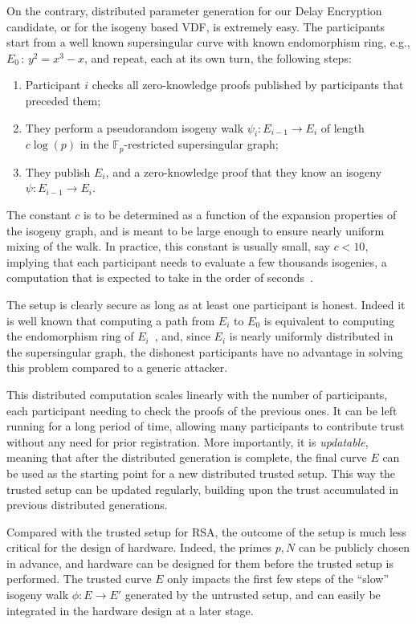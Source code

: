 \documentclass{llncs}
\newcommand{\F}{\mathbb{F}}
\begin{document}
On the contrary, distributed parameter generation for our Delay
Encryption candidate, or for the isogeny based VDF, is extremely
easy. %
The participants start from a well known supersingular curve with
known endomorphism ring, e.g., $E_0\,:\,y^2=x^3-x$, and repeat, each
at its own turn, the following steps:
\begin{enumerate}
\item Participant $i$ checks all zero-knowledge proofs published by
  participants that preceded them;
\item They perform a pseudorandom isogeny walk $\psi_i:E_{i-1}\to E_i$
  of length $c\log(p)$ in the $\F_p$-restricted supersingular graph;
\item They publish $E_i$, and a zero-knowledge proof that they know an
  isogeny $\psi:E_{i-1}\to E_i$.
\end{enumerate}

The constant $c$ is to be determined as a function of the expansion
properties of the isogeny graph, and is meant to be large enough to
ensure nearly uniform mixing of the walk. %
In practice, this constant is usually small, say $c<10$, implying that
each participant needs to evaluate a few thousands isogenies, a
computation that is expected to take in the order of
seconds~\cite{10.1007/978-3-030-03332-3_15}.

The setup is clearly secure as long as at least one participant is
honest. %
Indeed it is well known that computing a path from $E_i$ to $E_0$ is
equivalent to computing the endomorphism ring of
$E_i$~\cite{kohel2014quaternion,10.1007/978-3-319-78372-7_11}, and,
since $E_i$ is nearly uniformly distributed in the supersingular graph, the
dishonest participants have no advantage in solving this problem
compared to a generic attacker.

This distributed computation scales linearly with the number of
participants, each participant needing to check the proofs of the
previous ones. %
It can be left running for a long period of time, allowing many
participants to contribute trust without any need for prior
registration. %
More importantly, it is \emph{updatable}, meaning that after the
distributed generation is complete, the final curve $E$ can be used as
the starting point for a new distributed trusted setup. %
This way the trusted setup can be updated regularly, building upon the
trust accumulated in previous distributed generations.

Compared with the trusted setup for RSA, the outcome of the setup is
much less critical for the design of hardware. %
Indeed, the primes $p,N$ can be publicly chosen in advance, and
hardware can be designed for them before the trusted setup is
performed. %
The trusted curve $E$ only impacts the first few steps of the ``slow''
isogeny walk $\phi:E\to E'$ generated by the untrusted setup, and can
easily be integrated in the hardware design at a later stage.
\end{document}
